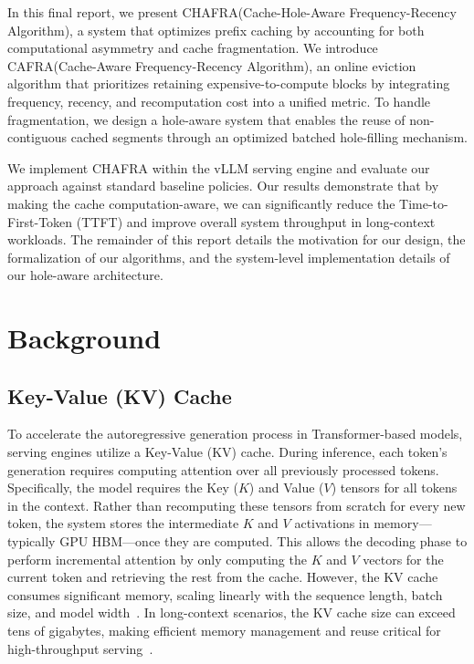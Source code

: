 \documentclass[letterpaper,twocolumn,10pt]{article}
\newcommand{\sys}{CHAFRA\xspace}
\newcommand{\sysfull}{Cache-Hole-Aware Frequency-Recency Algorithm\xspace}
\newcommand{\algo}{CAFRA\xspace}
\newcommand{\algofull}{Cache-Aware Frequency-Recency Algorithm\xspace}
\begin{document}
In this final report, we present \sys (\sysfull), a system that optimizes prefix caching by accounting for both computational asymmetry and cache fragmentation. We introduce \algo (\algofull), an online eviction algorithm that prioritizes retaining expensive-to-compute blocks by integrating frequency, recency, and recomputation cost into a unified metric. To handle fragmentation, we design a hole-aware system that enables the reuse of non-contiguous cached segments through an optimized batched hole-filling mechanism.

We implement \sys within the vLLM serving engine and evaluate our approach against standard baseline policies. Our results demonstrate that by making the cache computation-aware, we can significantly reduce the Time-to-First-Token (TTFT) and improve overall system throughput in long-context workloads. The remainder of this report details the motivation for our design, the formalization of our algorithms, and the system-level implementation details of our hole-aware architecture.

\section{Background}

\subsection{Key-Value (KV) Cache}
To accelerate the autoregressive generation process in Transformer-based models, 
serving engines utilize a Key-Value (KV) cache. During inference, each token's 
generation requires computing attention over all previously processed tokens. 
Specifically, the model requires the Key ($K$) and Value ($V$) tensors for all 
tokens in the context. Rather than recomputing these tensors from scratch for 
every new token, the system stores the intermediate $K$ and $V$ activations in 
memory---typically GPU HBM---once they are computed. This allows the decoding 
phase to perform incremental attention by only computing the $K$ and $V$ vectors 
for the current token and retrieving the rest from the cache. However, the KV 
cache consumes significant memory, scaling linearly with the sequence length, 
batch size, and model width~\cite{pope2023efficiently}. In long-context scenarios, the KV cache size can 
exceed tens of gigabytes, making efficient memory management and reuse critical 
for high-throughput serving~\cite{kwon2023efficient}.
\end{document}
